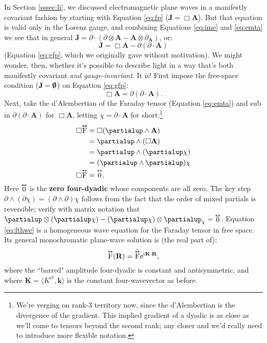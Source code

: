 \documentclass[12pt]{article}
\renewcommand{\vv}[1]{\mathbf{#1}}
\newcommand{\tightoverset}[2]{%
  \mathop{#2}\limits^{\vbox to -.5ex{\kern-0.75ex\hbox{$#1$}\vss}}}
\newcommand{\inlinedy}[1]{\tightoverset{\text{\tiny$\bm\leftrightarrow$}}{#1}}
\newcommand{\capdy}[1]{ \overset{ \text{\tiny$\bm\leftrightarrow$} }{\vphantom{\text{\small{A}}}\smash{#1}} }
\begin{document}
In Section \ref{sssec:li}, we discussed electromagnetic plane waves in a manifestly covariant fashion by starting with Equation \ref{eq:fp} ($\vv J = \Box \vv A$). But that equation is valid only in the Lorenz gauge, and combining Equations \ref{eq:ime} and \ref{eq:emta} we see that in general $\vv J = \partialup \cdot ( \partialup \otimes \vv A - \vv A \otimes \partialup_{\vv A} )$, or:
\begin{equation*}
\vv J = \Box \vv A - \partialup (\partialup \cdot \vv A)
\end{equation*}
(Equation \ref{eq:gfp}, which we originally gave without motivation). We might wonder, then, whether it's possible to describe light in a way that's both manifestly covariant \emph{and gauge-invariant}. It is! First impose the free-space condition ($\vv J = \textrm{\mbox{\boldmath $\emptyset$}}$) on Equation \ref{eq:gfp}:
\begin{equation*}
\Box \vv A = \partialup(\partialup \cdot \vv A).
\end{equation*}
Next, take the d'Alembertian of the Faraday tensor (Equation \ref{eq:emta}) and sub in $\partialup(\partialup \cdot \vv A)$ for $\Box \vv A$, letting $\chi = \partialup \cdot \vv A$ for short:\footnote{We're verging on rank-3 territory now, since the d'Alembertian is the divergence of the gradient. This implied gradient of a dyadic is as close as we'll come to tensors beyond the second rank; any closer and we'd really need to introduce more flexible notation.}
\begin{equation}\label{eq:fthwe}
\begin{split}
\Box \capdy{\mathrm{F}} &= \Box ( \partialup \wedge \vv A ) \\
&= \partialup \wedge ( \Box \vv A) \\
&= \partialup \wedge (\partialup \chi) \\
&= ( \partialup \wedge \partialup ) \chi \\
\Box \capdy{\mathrm{F}} &= \capdy{0} .
\end{split}
\end{equation}
Here $\inlinedy{0}$ is the \textbf{zero four-dyadic} whose components are all zero. The key step $\partialup \wedge (\partialup \chi) = (\partialup \wedge \partialup) \chi$ follows from the fact that the order of mixed partials is reversible; verify with matrix notation that $\partialup \otimes ( \partialup \chi ) - ( \partialup \chi ) \otimes \partialup_{\chi} = \inlinedy{0}$. Equation \ref{eq:fthwe} is a homogeneous wave equation for the Faraday tensor in free space. Its general monochromatic plane-wave solution is (the real part of):
\begin{equation}\label{eq:ftwe}
\capdy{\mathrm{F}} (\vv R) = \bar{\capdy{\mathrm{F}}} \mathrm{e}^{\mathrm{i} \mkern.5mu \vv K \cdot \vv R} ,
\end{equation}
where the ``barred" amplitude four-dyadic is constant and antisymmetric, and where $\vv K = \langle K^{ct}, \vv k \rangle$ is the constant four-wavevector as before.
\end{document}
